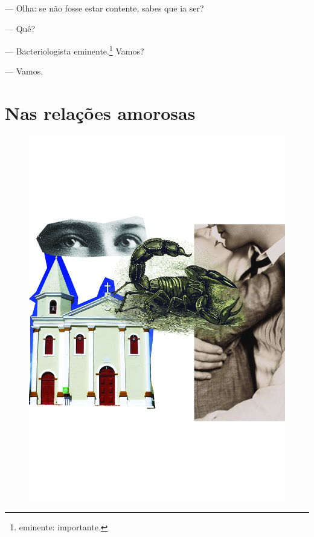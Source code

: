 --- Olha: se não fosse estar contente, sabes que ia ser?

--- Quê?

--- Bacteriologista eminente.\footnote{eminente: importante.} Vamos?

--- Vamos.

\part{Nas relações amorosas}

\pagebreak
\thispagestyle{empty}
\begin{figure}
\vspace*{-.5cm}
\hspace*{-2.3cm}\includegraphics[width=140mm]{../ilustracoes/10_PRIMAS.jpg}
\end{figure}
\pagebreak


